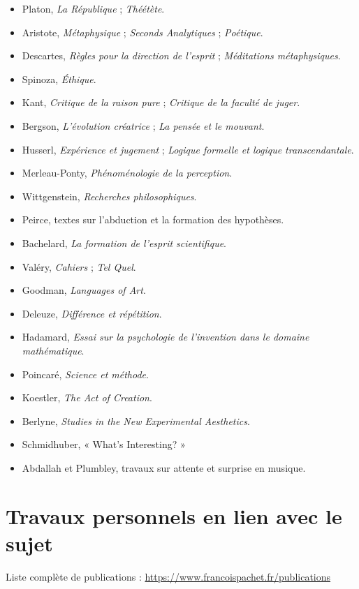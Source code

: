 \documentclass[10pt,a4paper]{article}
\begin{document}
\begin{itemize}
  \item Platon, \emph{La République} ; \emph{Théétète}.
  \item Aristote, \emph{Métaphysique} ; \emph{Seconds Analytiques} ;
        \emph{Poétique}.
  \item Descartes, \emph{Règles pour la direction de l'esprit} ;
        \emph{Méditations métaphysiques}.
  \item Spinoza, \emph{Éthique}.
  \item Kant, \emph{Critique de la raison pure} ;
        \emph{Critique de la faculté de juger}.
  \item Bergson, \emph{L'évolution créatrice} ; \emph{La pensée et le mouvant}.
  \item Husserl, \emph{Expérience et jugement} ;
        \emph{Logique formelle et logique transcendantale}.
  \item Merleau-Ponty, \emph{Phénoménologie de la perception}.
  \item Wittgenstein, \emph{Recherches philosophiques}.
  \item Peirce, textes sur l'abduction et la formation des hypothèses.
  \item Bachelard, \emph{La formation de l'esprit scientifique}.
  \item Valéry, \emph{Cahiers} ; \emph{Tel Quel}.
  \item Goodman, \emph{Languages of Art}.
  \item Deleuze, \emph{Différence et répétition}.
  \item Hadamard, \emph{Essai sur la psychologie de l'invention dans le domaine
        mathématique}.
  \item Poincaré, \emph{Science et méthode}.
  \item Koestler, \emph{The Act of Creation}.
  \item Berlyne, \emph{Studies in the New Experimental Aesthetics}.
  \item Schmidhuber, « What's Interesting? »
  \item Abdallah et Plumbley, travaux sur attente et surprise en musique.
\end{itemize}

\section*{Travaux personnels en lien avec le sujet}

Liste complète de publications :
\url{https://www.francoispachet.fr/publications}
\end{document}
